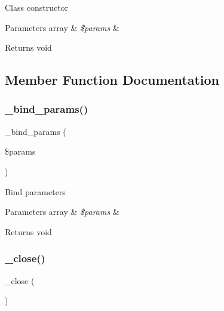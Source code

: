Class constructor


\begin{DoxyParams}[1]{Parameters}
array & {\em \$params} & \\
\hline
\end{DoxyParams}
\begin{DoxyReturn}{Returns}
void 
\end{DoxyReturn}


\subsection{Member Function Documentation}
\mbox{\label{class_c_i___d_b__oci8__driver_a66b8b06dadf7ff16c3877d5c024f5d2b}} 
\subsubsection{\texorpdfstring{\+\_\+bind\+\_\+params()}{\_bind\_params()}}
{\footnotesize\ttfamily \+\_\+bind\+\_\+params (\begin{DoxyParamCaption}\item[{}]{\$params }\end{DoxyParamCaption})\hspace{0.3cm}{\ttfamily [protected]}}

Bind parameters


\begin{DoxyParams}[1]{Parameters}
array & {\em \$params} & \\
\hline
\end{DoxyParams}
\begin{DoxyReturn}{Returns}
void 
\end{DoxyReturn}
\mbox{\label{class_c_i___d_b__oci8__driver_a4d9082658000e5ede8312067c6dda9db}} 
\subsubsection{\texorpdfstring{\+\_\+close()}{\_close()}}
{\footnotesize\ttfamily \+\_\+close (\begin{DoxyParamCaption}{ }\end{DoxyParamCaption})\hspace{0.3cm}{\ttfamily [protected]}}

